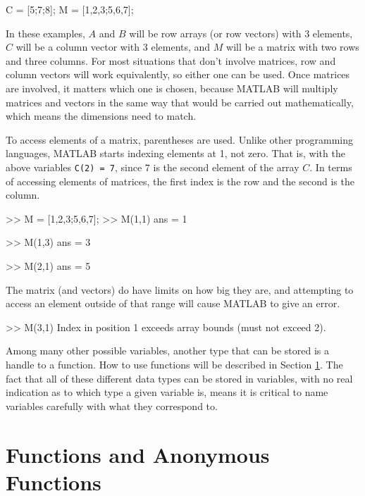 \begin{matlab}
C = [5;7;8];
M = [1,2,3;5,6,7];
\end{matlab}
In these examples, $A$ and $B$ will be row arrays (or row vectors) with 3 elements, $C$ will be a column vector with $3$ elements, and $M$ will be a matrix with two rows and three columns. For most situations that don't involve matrices, row and column vectors will work equivalently, so either one can be used. Once matrices are involved, it matters which one is chosen, because MATLAB will multiply matrices and vectors in the same way that would be carried out mathematically, which means the dimensions need to match.

To access elements of a matrix, parentheses are used. Unlike other programming languages, MATLAB starts indexing elements at 1, not zero. That is, with the above variables \texttt{C(2) = 7}, since $7$ is the second element of the array $C$. In terms of accessing elements of matrices, the first index is the row and the second is the column.
\begin{matlab}
>> M = [1,2,3;5,6,7];
>> M(1,1)
ans =
     1

>> M(1,3)
ans =
     3

>> M(2,1)
ans =
     5
\end{matlab}
The matrix (and vectors) do have limits on how big they are, and attempting to access an element outside of that range will cause MATLAB to give an error.

\begin{matlab}
>> M(3,1) 
Index in position 1 exceeds array bounds (must not exceed 2).
\end{matlab}

Among many other possible variables, another type that can be stored is a handle to a function. How to use functions will be described in Section \ref{funMat:section}. The fact that all of these different data types can be stored in variables, with no real indication as to which type a given variable is, means it is critical to name variables carefully with what they correspond to. 

\section{Functions and Anonymous Functions} \label{funMat:section}

